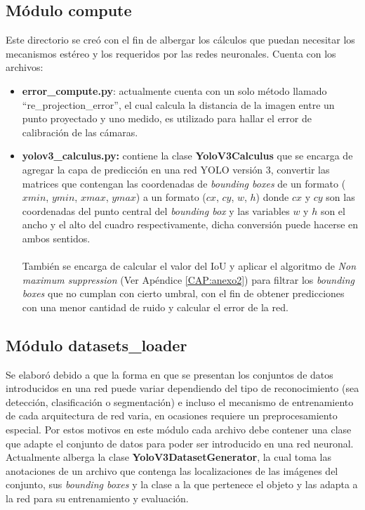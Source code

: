 \subsection{Módulo compute}
Este directorio se creó con el fin de albergar los cálculos que puedan necesitar los mecanismos estéreo y los requeridos por las redes neuronales. Cuenta con los archivos:
\begin{itemize}
    \item \textbf{error\_compute.py}: actualmente cuenta con un solo método llamado \\``re\_projection\_error'', el cual calcula la distancia de la imagen entre un punto proyectado y uno medido, es utilizado para hallar el error de calibración de las cámaras.
    \item \textbf{yolov3\_calculus.py:} contiene la clase \textbf{YoloV3Calculus} que se encarga de agregar la capa de predicción en una red YOLO versión 3, convertir las matrices que contengan las coordenadas de \textit{bounding boxes} de un formato ($xmin$, $ymin$, $xmax$, $ymax$) a un formato ($cx$, $cy$, $w$, $h$) donde $cx$ y $cy$ son las coordenadas del punto central del \textit{bounding box} y las variables $w$ y $h$ son el ancho y el alto del cuadro respectivamente, dicha conversión puede hacerse en ambos sentidos.
    \\
    \\
    También se encarga de calcular el valor del IoU y aplicar el algoritmo de \textit{Non maximum suppression} (Ver Apéndice \ref{CAP:anexo2}) para filtrar los \textit{bounding boxes} que no cumplan con cierto umbral, con el fin de obtener predicciones con una menor cantidad de ruido y calcular el error de la red.
\end{itemize}
\subsection{Módulo datasets\_loader}
Se elaboró debido a que la forma en que se presentan los conjuntos de datos introducidos en una red puede variar dependiendo del tipo de reconocimiento (sea detección, clasificación o segmentación) e incluso el mecanismo de entrenamiento de cada arquitectura de red varia, en ocasiones requiere un preprocesamiento especial. Por estos motivos en este módulo cada archivo debe contener una clase que adapte el conjunto de datos para poder ser introducido en una red neuronal. Actualmente alberga la clase \textbf{YoloV3DatasetGenerator}, la cual toma las anotaciones de un archivo que contenga las localizaciones de las imágenes del conjunto, sus \textit{bounding boxes} y la clase a la que pertenece el objeto y las adapta a la red para su entrenamiento y evaluación.  
